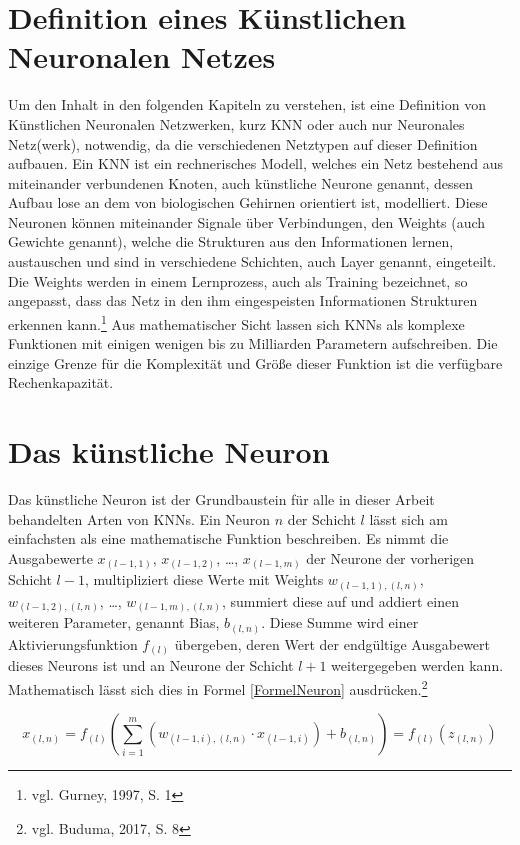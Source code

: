 \documentclass[
	a4paper,
	12pt,
	ngerman,
	oneside
]{scrreprt}											%
\begin{document}
		\section{Definition eines Künstlichen Neuronalen Netzes}\label{DefKNN}
			Um den Inhalt in den folgenden Kapiteln zu verstehen, ist eine Definition von Künstlichen Neuronalen Netzwerken, kurz KNN oder auch nur Neuronales Netz(werk), notwendig, da die verschiedenen Netztypen auf dieser Definition aufbauen. Ein KNN ist ein rechnerisches Modell, welches ein Netz bestehend aus miteinander verbundenen Knoten, auch künstliche Neurone genannt, dessen Aufbau lose an dem von biologischen Gehirnen orientiert ist, modelliert. Diese Neuronen können miteinander Signale über Verbindungen, den Weights (auch Gewichte genannt), welche die Strukturen aus den Informationen lernen, austauschen und sind in verschiedene Schichten, auch Layer genannt, eingeteilt. Die Weights werden in einem Lernprozess, auch als Training bezeichnet, so angepasst, dass das Netz in den ihm eingespeisten Informationen Strukturen erkennen kann.\footnote{vgl. Gurney, 1997, S. 1} Aus mathematischer Sicht lassen sich KNNs als komplexe Funktionen mit einigen wenigen bis zu Milliarden Parametern aufschreiben. Die einzige Grenze für die Komplexität und Größe dieser Funktion ist die verfügbare Rechenkapazität. 
			
		\section{Das künstliche Neuron}\label{DefKN}
			Das künstliche Neuron ist der Grundbaustein für alle in dieser Arbeit behandelten Arten von KNNs. Ein Neuron $n$ der Schicht $l$ lässt sich am einfachsten als eine mathematische Funktion beschreiben. Es nimmt die Ausgabewerte $x_{(l-1,1)}$, $x_{(l-1,2)}$, …, $x_{(l-1,m)}$ der Neurone der vorherigen Schicht $l-1$, multipliziert diese Werte mit Weights $w_{(l-1,1),(l,n)}$, $w_{(l-1,2),(l,n)}$, …, $w_{(l-1,m),(l,n)}$, summiert diese auf und addiert einen weiteren Parameter, genannt Bias, $b_{(l,n)}$. Diese Summe wird einer Aktivierungsfunktion $f_{(l)}$ übergeben, deren Wert der endgültige Ausgabewert dieses Neurons ist und an Neurone der Schicht $l+1$ weitergegeben werden kann. Mathematisch lässt sich dies in Formel \ref{FormelNeuron} ausdrücken.\footnote{vgl. Buduma, 2017, S. 8}
	
			\begin{equation}\label{FormelNeuron}
				x_{(l,n)} = f_{(l)} \left(\sum_{i=1}^{m}(w_{(l-1,i),(l,n)} \cdot x_{(l-1,i)}) + b_{(l,n)} \right) = f_{(l)}(z_{(l,n)})
			\end{equation}
			
\end{document}
